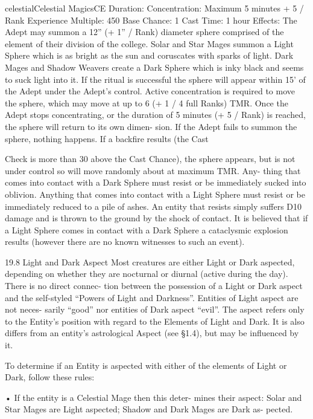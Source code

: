 \begin{College}[1.3]{celestial}{Celestial Magics}{CE}
Duration: Concentration: Maximum 5 minutes + 5 
/ Rank 
Experience Multiple: 450 
Base Chance: 1%
Cast Time: 1 hour 
Effects:  The  Adept  may  summon  a  12”  (+  1”  / 
Rank) diameter sphere comprised of the element of 
their division of the college. Solar and Star Mages 
summon  a  Light  Sphere  which  is  as  bright  as  the 
sun  and  coruscates  with  sparks  of  light.  Dark 
Mages and Shadow Weavers create a Dark Sphere 
which is inky black and seems to suck light into it. 
If  the  ritual  is  successful  the  sphere  will  appear 
within 15’ of the Adept under the Adept’s control. 
Active  concentration  is  required  to  move  the 
sphere,  which  may  move  at  up  to  6  (+  1  /  4  full 
Ranks) TMR. Once the Adept stops concentrating, 
or  the  duration  of  5  minutes  (+  5  /  Rank)  is 
reached,  the  sphere  will  return  to  its  own  dimen-
sion.  If  the  Adept  fails  to  summon  the  sphere, 
nothing  happens.  If  a  backfire  results  (the  Cast 

Check is more than 30 above the Cast Chance), the 
sphere  appears,  but  is  not  under  control  so  will 
move  randomly  about  at  maximum  TMR.  Any-
thing  that  comes  into  contact  with  a  Dark  Sphere 
must resist or be immediately sucked into oblivion. 
Anything  that  comes  into  contact  with  a  Light 
Sphere must resist or be immediately reduced to a 
pile  of  ashes.  An  entity  that  resists  simply  suffers 
D10  damage  and  is  thrown  to  the  ground  by  the 
shock  of  contact.  It  is  believed  that  if  a  Light 
Sphere  comes  in  contact  with  a  Dark  Sphere  a 
cataclysmic  explosion  results  (however  there  are 
no known witnesses to such an event). 

19.8 Light and Dark Aspect 
Most  creatures  are  either  Light  or  Dark  aspected, 
depending on whether they are nocturnal or diurnal 
(active during the day). There is no direct connec-
tion  between  the  possession  of  a  Light  or  Dark 
aspect  and  the  self-styled  “Powers  of  Light  and 
Darkness”.  Entities  of  Light  aspect  are  not  neces-
sarily  “good”  nor  entities  of  Dark  aspect  “evil”. 
The aspect refers only to the Entity’s position with 
regard to the Elements of Light and Dark. It is also 
differs  from  an  entity’s  astrological  Aspect  (see 
§1.4), but may be influenced by it. 

To determine if an Entity is aspected with either of 
the elements of Light or Dark, follow these rules:  

•  If  the  entity  is  a  Celestial  Mage  then  this  deter-
mines their aspect: Solar and Star Mages are Light 
aspected;  Shadow  and  Dark  Mages  are  Dark  as-
pected.  


\end{College}
